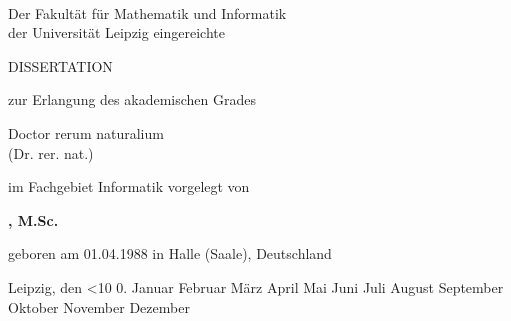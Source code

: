 
\renewcommand{\today}{\ifnum\number\day<10 0\fi \number\day.\space%
\ifcase \month \or Januar \or Februar \or März \or April \or Mai %
\or Juni \or Juli \or August \or September \or Oktober \or November \or Dezember \fi %
\number \year} 

\begin{titlepage}
	\begin{addmargin}[-1cm]{-3cm}
    \begin{center}
        \large  

        \hfill

        \vfill

        \begingroup
            \color{Maroon}\LARGE{\spacedallcaps{\myTitle}} \\ \bigskip
        \endgroup
        
    
        Der Fakultät für Mathematik und Informatik \\
        der Universität Leipzig eingereichte \\\vfill
        
        {\Huge DISSERTATION} \vfill\medskip
    
        zur Erlangung des akademischen Grades \\\vfill
        
        {\LARGE Doctor rerum naturalium}\\
        (Dr. rer. nat.)\\\vfill
        
        im Fachgebiet Informatik vorgelegt von\\\vfill
        
        \textbf{\myName, M.Sc.} \\\vfill
        
        geboren am 01.04.1988 in Halle (Saale), Deutschland \\\vfill
        
        Leipzig, den \today\vfill



        

        
%        
%
%

    \end{center}  
  \end{addmargin}       
\end{titlepage}   